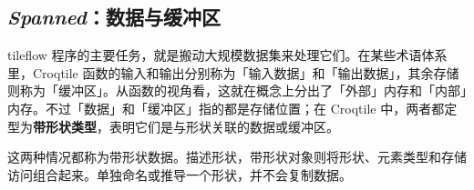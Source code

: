 \subsection*{\emph{Spanned}：数据与缓冲区}

tileflow 程序的主要任务，就是搬动大规模数据集来处理它们。在某些术语体系里，Croqtile 函数的输入和输出分别称为「输入数据」和「输出数据」，其余存储则称为「缓冲区」。从函数的视角看，这就在概念上分出了「外部」内存和「内部」内存。不过「数据」和「缓冲区」指的都是存储位置；在 Croqtile 中，两者都定型为\textbf{带形状类型}，表明它们是与形状关联的数据或缓冲区。

这两种情况都称为带形状数据。\co@mdspan@ 描述形状，带形状对象则将形状、元素类型和存储访问组合起来。单独命名或推导一个形状，并不会复制数据。
